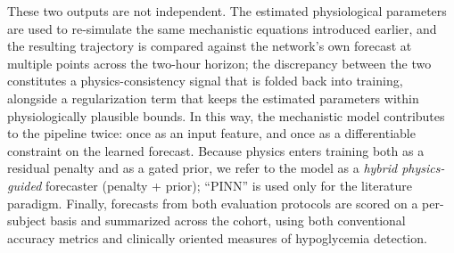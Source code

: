 \documentclass[journal]{IEEEtran}
\begin{document}
These two outputs are not independent. The estimated physiological parameters are used to re-simulate the same mechanistic equations introduced earlier, and the resulting trajectory is compared against the network's own forecast at multiple points across the two-hour horizon; the discrepancy between the two constitutes a physics-consistency signal that is folded back into training, alongside a regularization term that keeps the estimated parameters within physiologically plausible bounds. In this way, the mechanistic model contributes to the pipeline twice: once as an input feature, and once as a differentiable constraint on the learned forecast. Because physics enters training both as a residual penalty and as a gated prior, we refer to the model as a \emph{hybrid physics-guided} forecaster (penalty + prior); ``PINN'' is used only for the literature paradigm. Finally, forecasts from both evaluation protocols are scored on a per-subject basis and summarized across the cohort, using both conventional accuracy metrics and clinically oriented measures of hypoglycemia detection.
\end{document}
